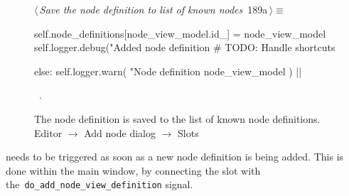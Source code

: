 \documentclass[%
    a4paper,    %
    justified,  %
    nobib,      %
    openany     %
]{tufte-book}
\makeatletter
\renewcommand{\label}[1]{\@tufte@label{##1}}%
\makeatother
\begin{document}
\begin{figure}[!htbp]
\begin{flushleft} \small
\begin{minipage}{\linewidth}\label{scrap170}\raggedright\small
{} $\langle\,${\itshape Save the node definition to list of known nodes}\nobreak\ {\footnotesize {189a}}$\,\rangle\equiv$
\vspace{-1ex}
\begin{pythoncode}
    self.node_definitions[node_view_model.id_] = node_view_model
    self.logger.debug("Added node definition %
    # TODO: Handle shortcuts

else:
    self.logger.warn(
        "Node definition %
        node_view_model
    )
|\NWsep|
\end{pythoncode}
\vspace{1.5ex}
\footnotesize
\begin{list}{}{\setlength{\itemsep}{-\parsep}\setlength{\itemindent}{-\leftmargin}}
\item \NWtxtMacroRefIn\ .

\item{}
\end{list}
\end{minipage}\vspace{4ex}
\end{flushleft}
\caption{The node definition is saved to the list of known node definitions.
  \newline{}\newline{}Editor $\rightarrow$ Add node dialog $\rightarrow$ Slots}
\end{figure}

 needs to be triggered as soon as a new node
definition is being added. This is done within the main window, by connecting
the slot with the~\verb=do_add_node_view_definition= signal.
\end{document}
